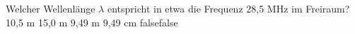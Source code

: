     {Welcher Wellenlänge $\lambda$ entspricht in etwa die Frequenz 28,5 MHz im Freiraum? }
    {10,5 m}
    {15,0 m}
    {9,49 m}
    {9,49 cm}
    {false}{false}